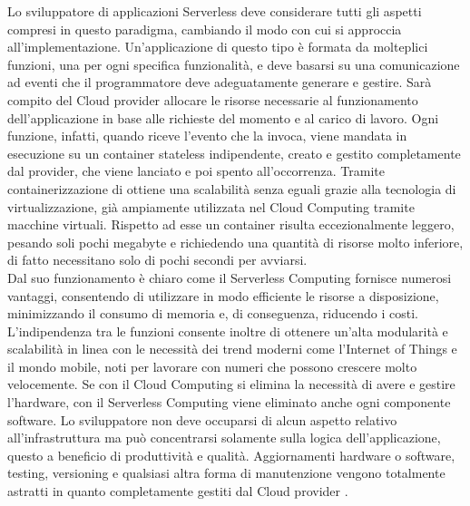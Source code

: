 Lo sviluppatore di applicazioni Serverless deve considerare tutti gli aspetti compresi in questo paradigma, cambiando il modo con cui si approccia all’implementazione. Un’applicazione di questo tipo è formata da molteplici funzioni, una per ogni specifica funzionalità, e deve basarsi su una comunicazione ad eventi che il programmatore deve adeguatamente generare e gestire. Sarà compito del Cloud provider allocare le risorse necessarie al funzionamento dell’applicazione in base alle richieste del momento e al carico di lavoro. Ogni funzione, infatti, quando riceve l’evento che la invoca, viene mandata in esecuzione su un container stateless indipendente, creato e gestito completamente dal provider, che viene lanciato e poi spento all’occorrenza. Tramite containerizzazione di ottiene una scalabilità senza eguali grazie alla tecnologia di virtualizzazione, già ampiamente utilizzata nel Cloud Computing tramite macchine virtuali. Rispetto ad esse un container risulta eccezionalmente leggero, pesando soli pochi megabyte e richiedendo una quantità di risorse molto inferiore, di fatto necessitano solo di pochi secondi per avviarsi. \\
Dal suo funzionamento è chiaro come il Serverless Computing fornisce numerosi vantaggi, consentendo di utilizzare in modo efficiente le risorse a disposizione, minimizzando il consumo di memoria e, di conseguenza, riducendo i costi. L’indipendenza tra le funzioni consente inoltre di ottenere un’alta modularità e scalabilità in linea con le necessità dei trend moderni come l’Internet of Things e il mondo mobile, noti per lavorare con numeri che possono crescere molto velocemente. Se con il Cloud Computing si elimina la necessità di avere e gestire l’hardware, con il Serverless Computing viene eliminato anche ogni componente software. Lo sviluppatore non deve occuparsi di alcun aspetto relativo all’infrastruttura ma può concentrarsi solamente sulla logica dell’applicazione, questo a beneficio di produttività e qualità. Aggiornamenti hardware o software, testing, versioning e qualsiasi altra forma di manutenzione vengono totalmente astratti in quanto completamente gestiti dal Cloud provider \cite{ServerlessBerkley}. 

